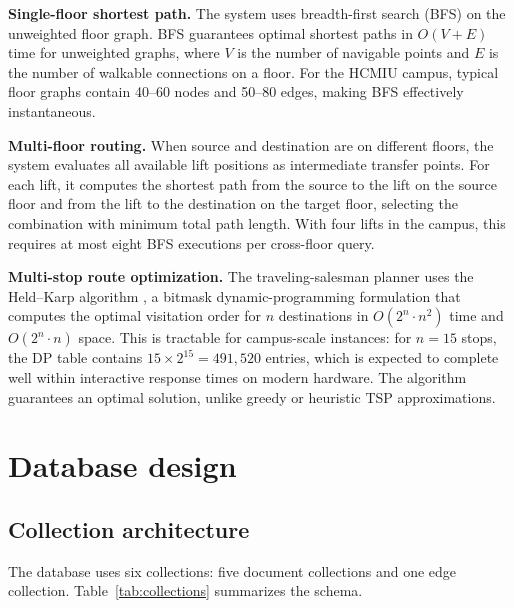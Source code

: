 \documentclass[13pt,a4paper]{report}
\begin{document}
\textbf{Single-floor shortest path.} The system uses breadth-first search (BFS) on the unweighted floor graph. BFS guarantees optimal shortest paths in $O(V + E)$ time for unweighted graphs, where $V$ is the number of navigable points and $E$ is the number of walkable connections on a floor. For the HCMIU campus, typical floor graphs contain 40--60 nodes and 50--80 edges, making BFS effectively instantaneous.

\textbf{Multi-floor routing.} When source and destination are on different floors, the system evaluates all available lift positions as intermediate transfer points. For each lift, it computes the shortest path from the source to the lift on the source floor and from the lift to the destination on the target floor, selecting the combination with minimum total path length. With four lifts in the campus, this requires at most eight BFS executions per cross-floor query.

\textbf{Multi-stop route optimization.} The traveling-salesman planner uses the Held--Karp algorithm \cite{bellman1962,held1962dynamic}, a bitmask dynamic-programming formulation that computes the optimal visitation order for $n$ destinations in $O(2^n \cdot n^2)$ time and $O(2^n \cdot n)$ space. This is tractable for campus-scale instances: for $n = 15$ stops, the DP table contains $15 \times 2^{15} = 491{,}520$ entries, which is expected to complete well within interactive response times on modern hardware. The algorithm guarantees an optimal solution, unlike greedy or heuristic TSP approximations.

\section{Database design}
\subsection{Collection architecture}
The database uses six collections: five document collections and one edge collection. Table~\ref{tab:collections} summarizes the schema.
\end{document}
